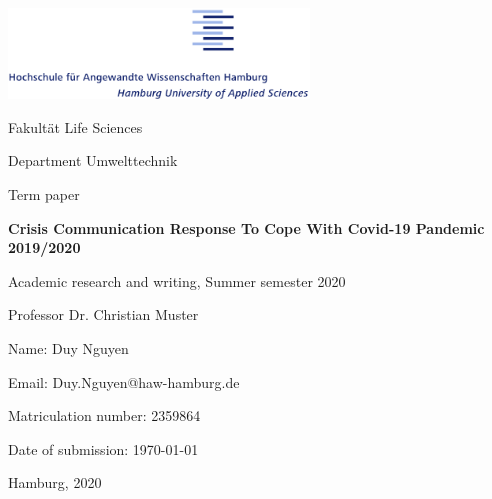 \begin{titlepage}
	\begin{flushright}
		\includegraphics[width=0.6\textwidth]{HAW_logo.png}

		Fakult\"at Life Sciences

		Department Umwelttechnik
	\end{flushright}
	
	\vspace{3cm}

	\begin{center}
		\large{Term paper}

		\huge{\textbf{Crisis Communication Response To Cope With Covid-19 Pandemic 2019/2020}}

		\vspace{1cm}
		
		\normalsize{Academic research and writing, Summer semester 2020}

		\normalsize{Professor Dr. Christian Muster}
	\end{center}

	\vspace{5cm}

	\begin{flushleft}
		Name: Duy Nguyen

		Email: Duy.Nguyen@haw-hamburg.de

		Matriculation number: 2359864

		Date of submission: \today
	\end{flushleft}

	\vfill
	\begin{center}
	Hamburg, 2020
	\end{center}
	\clearpage
\end{titlepage}
